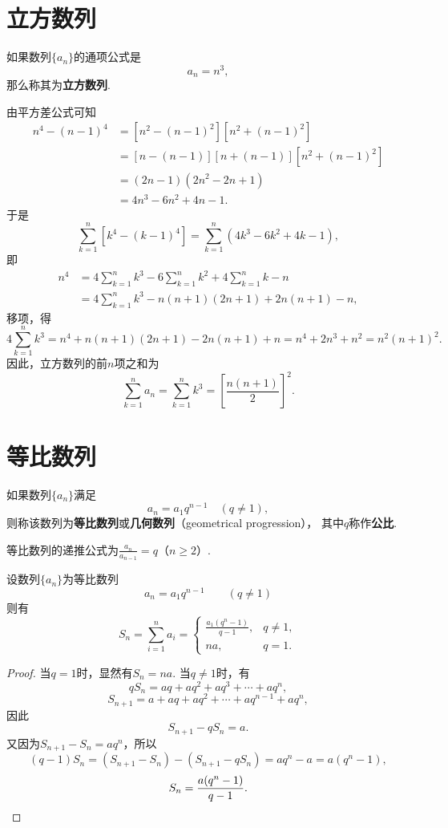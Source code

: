 \section{立方数列}
如果数列\(\{a_n\}\)的通项公式是\[
a_n = n^3,
\]那么称其为\textbf{立方数列}.

由平方差公式可知
\[\begin{aligned}
n^4 - (n-1)^4
&= [n^2 - (n-1)^2] [n^2 + (n-1)^2] \\
&= [n - (n-1)] [n + (n-1)] [n^2 + (n-1)^2] \\
&= (2n-1) (2n^2 - 2n + 1) \\
&= 4n^3 - 6n^2 + 4n - 1.
\end{aligned}\]
于是\[
\sum\limits_{k=1}^n [k^4 - (k-1)^4]
= \sum\limits_{k=1}^n (4k^3 - 6k^2 + 4k - 1),
\]即\[\begin{aligned}
n^4
&= 4 \sum\limits_{k=1}^n k^3 - 6 \sum\limits_{k=1}^n k^2 + 4 \sum\limits_{k=1}^n k - n \\
&= 4 \sum\limits_{k=1}^n k^3 - n(n+1)(2n+1) + 2n(n+1) - n,
\end{aligned}\]
移项，得\[
4 \sum\limits_{k=1}^n k^3
= n^4 + n(n+1)(2n+1) - 2n(n+1) + n
= n^4 + 2n^3 + n^2
= n^2(n+1)^2.
\]
因此，立方数列的前\(n\)项之和为
\begin{equation}
\sum\limits_{k=1}^n a_n
= \sum\limits_{k=1}^n k^3
= \left[\frac{n(n+1)}{2}\right]^2.
\end{equation}

\section{等比数列}
\begin{definition}
如果数列\(\{a_n\}\)满足\[
a_n = a_1 q^{n-1} \quad(q\neq1),
\]则称该数列为\textbf{等比数列}或\textbf{几何数列}（geometrical progression），
其中\(q\)称作\textbf{公比}.

等比数列的递推公式为\(\frac{a_n}{a_{n-1}} = q\)（\(n \geqslant 2\)）.
\end{definition}

\begin{property}[等比数列求和]
设数列\(\{a_n\}\)为等比数列\[
a_n = a_1 q^{n-1} \qquad (q \neq 1)
\]则有\[
S_n = \sum\limits_{i=1}^n a_i
= \left\{ \begin{array}{cl}
\frac{a_1 (q^n-1)}{q-1}, & q \neq 1, \\
na, & q = 1.
\end{array} \right.
\]
\begin{proof}
当\(q = 1\)时，显然有\(S_n = na\).
当\(q \neq 1\)时，有\[
q S_n = aq+aq^2+aq^3+\dotsb+aq^n,
\]\[
S_{n+1} = a+aq+aq^2+\dotsb+aq^{n-1}+aq^n,
\]因此\[
S_{n+1} - q S_n = a.
\]又因为\(S_{n+1} - S_n = aq^n\)，所以\[
(q-1) S_n = (S_{n+1} - S_n) - (S_{n+1} - q S_n) = aq^n - a = a(q^n - 1),
\]\[
S_n = \frac{a(q^n - 1)}{q-1}.
\qedhere
\]
\end{proof}
\end{property}

